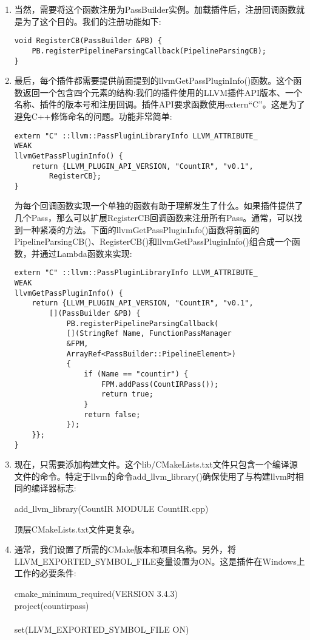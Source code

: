 \begin{enumerate}
\item 当然，需要将这个函数注册为PassBuilder实例。加载插件后，注册回调函数就是为了这个目的。我们的注册功能如下:
\begin{lstlisting}[caption={}]
void RegisterCB(PassBuilder &PB) {
	PB.registerPipelineParsingCallback(PipelineParsingCB);
}
\end{lstlisting}
	
\item 最后，每个插件都需要提供前面提到的llvmGetPassPluginInfo()函数。这个函数返回一个包含四个元素的结构:我们的插件使用的LLVM插件API版本、一个名称、插件的版本号和注册回调。插件API要求函数使用extern“C”。这是为了避免C++修饰命名的问题。功能非常简单:
\begin{lstlisting}[caption={}]
extern "C" ::llvm::PassPluginLibraryInfo LLVM_ATTRIBUTE_
WEAK
llvmGetPassPluginInfo() {
	return {LLVM_PLUGIN_API_VERSION, "CountIR", "v0.1",
		RegisterCB};
}
\end{lstlisting}
为每个回调函数实现一个单独的函数有助于理解发生了什么。如果插件提供了几个Pass，那么可以扩展RegisterCB回调函数来注册所有Pass。通常，可以找到一种紧凑的方法。下面的llvmGetPassPluginInfo()函数将前面的PipelineParsingCB()、RegisterCB()和llvmGetPassPluginInfo()组合成一个函数，并通过Lambda函数来实现:
\begin{lstlisting}[caption={}]
extern "C" ::llvm::PassPluginLibraryInfo LLVM_ATTRIBUTE_
WEAK
llvmGetPassPluginInfo() {
	return {LLVM_PLUGIN_API_VERSION, "CountIR", "v0.1",
		[](PassBuilder &PB) {
			PB.registerPipelineParsingCallback(
			[](StringRef Name, FunctionPassManager 
			&FPM,
			ArrayRef<PassBuilder::PipelineElement>) 
			{
				if (Name == "countir") {
					FPM.addPass(CountIRPass());
					return true;
				}
				return false;
			});
	}};
}
\end{lstlisting}
	
\item 现在，只需要添加构建文件。这个lib/CMakeLists.txt文件只包含一个编译源文件的命令。特定于llvm的命令add\underline{~}llvm\underline{~}library()确保使用了与构建llvm时相同的编译器标志:
\begin{tcolorbox}[colback=white,colframe=black]
add\underline{~}llvm\underline{~}library(CountIR MODULE CountIR.cpp)
\end{tcolorbox}
顶层CMakeLists.txt文件更复杂。
	
\item 通常，我们设置了所需的CMake版本和项目名称。另外，将LLVM\underline{~}EXPORTED\underline{~}SYMBOL\underline{~}FILE变量设置为ON。这是插件在Windows上工作的必要条件:
\begin{tcolorbox}[colback=white,colframe=black]
cmake\underline{~}minimum\underline{~}required(VERSION 3.4.3) \\
project(countirpass)\\
\\
set(LLVM\underline{~}EXPORTED\underline{~}SYMBOL\underline{~}FILE ON)
\end{tcolorbox}
	

\end{enumerate}

